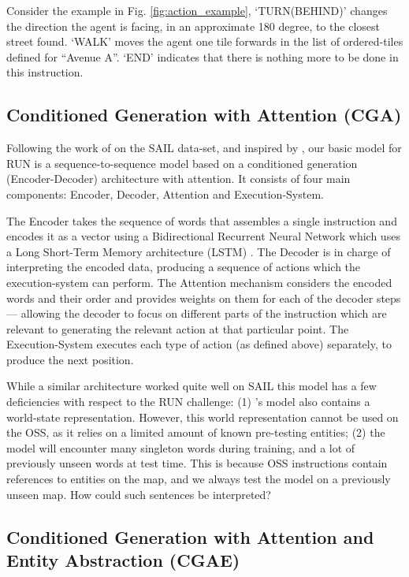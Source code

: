 \documentclass[11pt,a4paper]{article}
\begin{document}
 
Consider the example in Fig. \ref{fig:action_example}, \enquote*{TURN(BEHIND)} changes the direction the agent is facing, in an approximate 180 degree, to the closest street found. \enquote*{WALK} moves the agent one tile forwards in the list of ordered-tiles defined for \enquote{Avenue A}. \enquote*{END} indicates that there is nothing more to be done in this instruction.  



\subsection{Conditioned Generation with Attention (CGA)}
Following the work of \citet{mei2015listen} on the SAIL data-set, and inspired by \citet{xu2015show}, our basic model for RUN is a sequence-to-sequence model based on a conditioned generation (Encoder-Decoder) architecture with attention. It consists of four main components: Encoder, Decoder, Attention and Execution-System.

The Encoder  takes the sequence of words that assembles a single instruction and encodes it as a vector using a Bidirectional Recurrent Neural Network which uses a Long Short-Term Memory architecture (LSTM) \citep {graves2005framewise}.  
The Decoder is in charge of interpreting the encoded data,  producing a sequence of actions which the execution-system can perform. 
%
The Attention mechanism considers the encoded words and their order and  provides weights on them for each of the decoder steps ---  allowing the decoder to focus on different parts of the instruction which are relevant to generating the  relevant action at that particular point.
%
The Execution-System executes each type of action (as defined above)  separately, to produce the next position. 

While a similar architecture worked quite well on SAIL \cite{mei2015listen} this model has a few deficiencies with respect to the RUN challenge: (1) \citet{mei2015listen}'s model also contains a world-state representation. However, this world representation cannot be used on the OSS, as it relies on a limited amount of known pre-testing entities; (2) the model will encounter many singleton words during training, and a lot of previously unseen words at test time. This is because  OSS instructions  contain  references to entities on the map, and we always test the model on a previously unseen map. How could such sentences be interpreted? 


\subsection{Conditioned Generation with Attention and Entity Abstraction (CGAE)}
\end{document}
